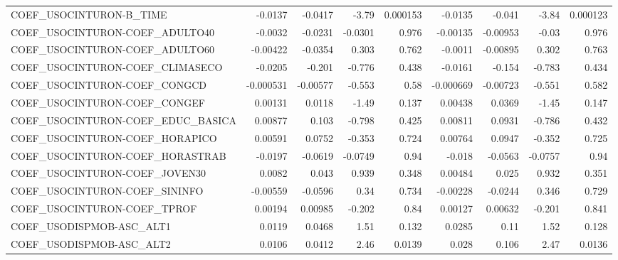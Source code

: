\begin{tabular}{lrrrrrrrr}
COEF\_USOCINTURON-B\_TIME           &     -0.0137 &      -0.0417 &   -3.79 & 0.000153 &    -0.0135 &      -0.041 &        -3.84 &      0.000123 \\
COEF\_USOCINTURON-COEF\_ADULTO40    &     -0.0032 &      -0.0231 & -0.0301 &    0.976 &   -0.00135 &    -0.00953 &        -0.03 &         0.976 \\
COEF\_USOCINTURON-COEF\_ADULTO60    &    -0.00422 &      -0.0354 &   0.303 &    0.762 &    -0.0011 &    -0.00895 &        0.302 &         0.763 \\
COEF\_USOCINTURON-COEF\_CLIMASECO   &     -0.0205 &       -0.201 &  -0.776 &    0.438 &    -0.0161 &      -0.154 &       -0.783 &         0.434 \\
COEF\_USOCINTURON-COEF\_CONGCD      &   -0.000531 &     -0.00577 &  -0.553 &     0.58 &  -0.000669 &    -0.00723 &       -0.551 &         0.582 \\
COEF\_USOCINTURON-COEF\_CONGEF      &     0.00131 &       0.0118 &   -1.49 &    0.137 &    0.00438 &      0.0369 &        -1.45 &         0.147 \\
COEF\_USOCINTURON-COEF\_EDUC\_BASICA &     0.00877 &        0.103 &  -0.798 &    0.425 &    0.00811 &      0.0931 &       -0.786 &         0.432 \\
COEF\_USOCINTURON-COEF\_HORAPICO    &     0.00591 &       0.0752 &  -0.353 &    0.724 &    0.00764 &      0.0947 &       -0.352 &         0.725 \\
COEF\_USOCINTURON-COEF\_HORASTRAB   &     -0.0197 &      -0.0619 & -0.0749 &     0.94 &     -0.018 &     -0.0563 &      -0.0757 &          0.94 \\
COEF\_USOCINTURON-COEF\_JOVEN30     &      0.0082 &        0.043 &   0.939 &    0.348 &    0.00484 &       0.025 &        0.932 &         0.351 \\
COEF\_USOCINTURON-COEF\_SININFO     &    -0.00559 &      -0.0596 &    0.34 &    0.734 &   -0.00228 &     -0.0244 &        0.346 &         0.729 \\
COEF\_USOCINTURON-COEF\_TPROF       &     0.00194 &      0.00985 &  -0.202 &     0.84 &    0.00127 &     0.00632 &       -0.201 &         0.841 \\
COEF\_USODISPMOB-ASC\_ALT1          &      0.0119 &       0.0468 &    1.51 &    0.132 &     0.0285 &        0.11 &         1.52 &         0.128 \\
COEF\_USODISPMOB-ASC\_ALT2          &      0.0106 &       0.0412 &    2.46 &   0.0139 &      0.028 &       0.106 &         2.47 &        0.0136 \\

\end{tabular}
